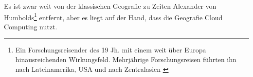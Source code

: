 Es ist zwar weit von der klassischen Geografie zu Zeiten Alexander von Humbolds\footnote{Ein Forschungsreisender des 19 Jh. mit einem weit über Europa hinausreichenden Wirkungsfeld. Mehrjährige Forschungsreisen führten ihn nach Lateinamerika, USA und nach Zentralasien \cite{Kehlmann2005}} entfernt, aber es liegt auf der Hand, dass die Geografie Cloud Computing nutzt.
